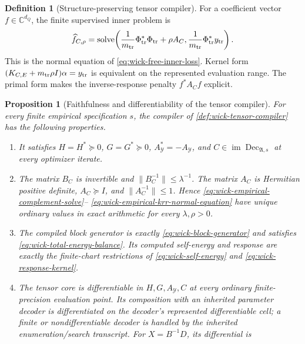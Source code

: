 \documentclass[11pt]{article}
\numberwithin{section}{part}
\theoremstyle{plain}
\newtheorem{proposition}[proposition]{Proposition}
\theoremstyle{definition}
\newtheorem{definition}[definition]{Definition}
\theoremstyle{remark}
\begin{document}
\begin{definition}[Structure-preserving tensor compiler]
For a coefficient vector \(f\in\mathbb C^{d_Q}\), the finite supervised
inner problem is
\begin{equation}
 \label{eq:wick-empirical-krr-normal-equation}
 \widehat f_{C,\rho}
 =\operatorname{solve}\!\left(
   \frac1{m_{\rm tr}}\Phi_{\rm tr}^*\Phi_{\rm tr}+\rho A_C,
   \frac1{m_{\rm tr}}\Phi_{\rm tr}^*y_{\rm tr}
  \right).
\end{equation}
This is the normal equation of
\eqref{eq:wick-free-inner-loss}.  Kernel form
\((K_{C,E}+m_{\rm tr}\rho I)\alpha=y_{\rm tr}\) is equivalent on the
represented evaluation range.  The primal form makes the inverse-response
penalty \(f^*A_Cf\) explicit.
\end{definition}

\begin{proposition}[Faithfulness and differentiability of the tensor compiler]
\label{prop:wick-tensor-compiler-faithfulness}
For every finite empirical specification \(s\), the compiler of
\cref{def:wick-tensor-compiler} has the following properties.
\begin{enumerate}[label=\textup{(\roman*)}]
\item It satisfies \(H=H^*\succeq0\), \(G=G^*\succeq0\),
      \(A_{\mathcal Y}^*=-A_{\mathcal Y}\), and
      \(C\in\operatorname{im}\operatorname{Dec}_{\mathfrak A,s}\) at every
      optimizer iterate.
\item The matrix \(B_C\) is invertible and
      \(\|B_C^{-1}\|\le\lambda^{-1}\).  The matrix \(A_C\) is Hermitian
      positive definite, \(A_C\succeq I\), and
      \(\|A_C^{-1}\|\le1\).  Hence
      \eqref{eq:wick-empirical-complement-solve}--
      \eqref{eq:wick-empirical-krr-normal-equation} have unique ordinary
      values in exact arithmetic for every \(\lambda,\rho>0\).
\item The compiled block generator is exactly
      \eqref{eq:wick-block-generator} and satisfies
      \eqref{eq:wick-total-energy-balance}.  Its computed self-energy and
      response are exactly the finite-chart restrictions of
      \eqref{eq:wick-self-energy} and \eqref{eq:wick-response-kernel}.
\item The tensor core is differentiable in \(H,G,A_{\mathcal Y},C\) at every
      ordinary finite-precision evaluation point.  Its composition with an
      inherited parameter decoder is differentiated on the decoder's
      represented differentiable cell; a finite or nondifferentiable decoder
      is handled by the inherited enumeration/search transcript.  For
      \(X=B^{-1}D\), its differential is

\end{enumerate}
\end{proposition}
\end{document}
